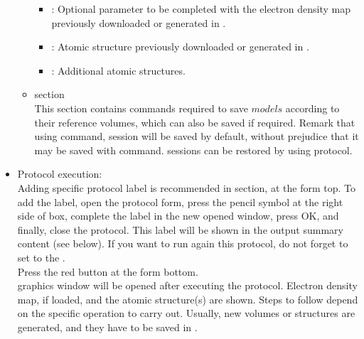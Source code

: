 \begin{itemize}
\begin{itemize}
    \begin{itemize}
     \item {}: Optional parameter to be completed with the electron density map previously downloaded or generated in \scipion.\\
     \item {}: Atomic structure previously downloaded or generated in \scipion.\\
     \item {}: Additional atomic structures.\\
    \end{itemize}
    \item {} section\\
    
    This section contains \chimera commands required to save $models$ according to their reference volumes, which can also be saved if required. Remark that using  command, \chimera session will be saved by default, without prejudice that it may be saved with  command. \chimera sessions can be restored by using  protocol.\\
    
    \end{itemize}

  \item Protocol execution:\\
  
  Adding specific protocol label is recommended in  section, at the form top. To add the label, open the protocol form, press the pencil symbol at the right side of  box, complete the label in the new opened window, press OK, and finally, close the protocol. This label will be shown in the output summary content (see below). If you want to run again this protocol, do not forget to set to  the .\\
  Press the  red button at the form bottom.\\
  
  \chimera graphics window will be opened after executing the protocol. Electron density map, if loaded, and the atomic structure(s) are shown. Steps to follow depend on the specific operation to carry out. Usually, new volumes or structures are generated, and they have to be saved in \scipion.\\
  \begin{itemize}
   

\end{itemize}
\end{itemize}
